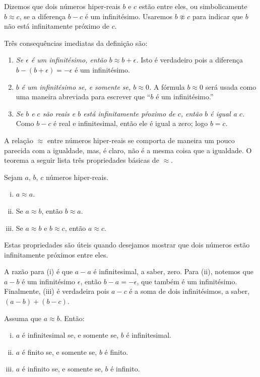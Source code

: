 \begin{defin}
Dizemos que dois números hiper-reais $b$ e $c$ estão  entre eles, ou simbolicamente $b \approx c$, se a diferença
$b - c$ é um infinitésimo. Usaremos $b \not\approx c$ para indicar que
$b$ não está infinitamente próximo de $c$.
\end{defin}

Três consequências imediatas da definição são:
\begin{enumerate}[(1)]
\item \emph{Se $\epsilon$ é um infinitésimo, então $b \approx b + \epsilon$.}
      Isto é verdadeiro pois a diferença $b - (b+\epsilon) = -\epsilon$
      é um infinitésimo.
\item \emph{$b$ é um infinitésimo se, e somente se, $b \approx 0$.} A
      fórmula $b \approx 0$ será usada como uma maneira abreviada para
      escrever que ``$b$ é um infinitésimo.''
\item \emph{Se $b$ e $c$ são reais e $b$ está infinitamente pŕoximo de $c$,
      então $b$ é igual a $c$.} Como $b-c$ é real e infinitesimal, então
      ele é igual a zero; logo $b=c$.
\end{enumerate}

A relação $\approx$ entre números hiper-reais se comporta de maneira
um pouco parecida com a igualdade, mas, é claro, não é a mesma coisa
que a igualdade. O teorema a seguir lista três propriedades básicas de
$\approx$.

\begin{theorem} Sejam $a$, $b$, $c$ números hiper-reais.
\begin{enumerate}[(i)]
\item $a \approx a$.
\item Se $a \approx b$, então $b \approx a$.
\item Se $a \approx b$ e $b \approx c$, então $a \approx c$.
\end{enumerate}
\end{theorem}

Estas propriedades são úteis quando desejamos mostrar que dois números
estão infinitamente próximos entre eles.

A razão para (i) é que $a-a$ é infinitesimal, a saber, zero. Para (ii),
notemos que $a-b$ é um infinitésimo $\epsilon$, então $b-a = -\epsilon$,
que também é um infinitésimo. Finalmente, (iii) é verdadeira pois $a-c$
é a soma de dois infinitésimos, a saber, $(a-b) + (b-c)$.

\begin{theorem}
\label{teo:propinfinitelyclose2}
Assuma que $a \approx b$. Então:
\begin{enumerate}[(i)]
\item $a$ é infinitesimal se, e somente se, $b$ é infinitesimal.
\item $a$ é finito se, e somente se, $b$ é finito.
\item $a$ é infinito se, e somente se, $b$ é infinito.
\end{enumerate}
\end{theorem}

